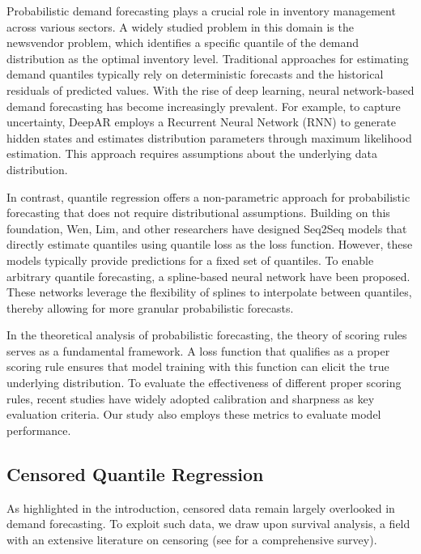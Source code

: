 \documentclass[sigconf]{acmart}
\begin{document}
Probabilistic demand forecasting plays a crucial role in inventory management across various sectors. A widely studied problem in this domain is the newsvendor problem, which identifies a specific quantile of the demand distribution as the optimal inventory level\citep{ban2019big,beutel2012safety}. Traditional approaches for estimating demand quantiles typically rely on deterministic forecasts and the historical residuals of predicted values\citep{levi2015data}. With the rise of deep learning, neural network-based demand forecasting has become increasingly prevalent. For example, to capture uncertainty, DeepAR employs a Recurrent Neural Network (RNN) to generate hidden states and estimates distribution parameters through maximum likelihood estimation\citep{salinas2020deepar}. This  approach requires assumptions about the underlying data distribution.

In contrast, quantile regression offers a non-parametric approach for probabilistic forecasting that does not require distributional assumptions\citep{koenker1978regression}. Building on this foundation, Wen, Lim, and other researchers\citep{wen2017multi,lim2021temporal} have designed Seq2Seq models that directly estimate quantiles using quantile loss as the loss function. However, these models typically provide predictions for a fixed set of quantiles. To enable arbitrary quantile forecasting, a spline-based neural network have been proposed\citep{gasthaus2019probabilistic,park2022learning,taieb2022learning,brando2022deep}. These networks leverage the flexibility of splines to interpolate between quantiles, thereby allowing for more granular probabilistic forecasts.

In the theoretical analysis of probabilistic forecasting, the theory of scoring rules serves as a fundamental framework. A loss function that qualifies as a proper scoring rule ensures that model training with this function can elicit the true underlying distribution\citep{gneiting2007strictly}. To evaluate the effectiveness of different proper scoring rules, recent studies have widely adopted calibration and sharpness as key evaluation criteria\citep{chung2021beyond,taieb2022learning,feldman2021improving}. Our study also employs these metrics to evaluate model performance.


\subsection{Censored Quantile Regression}
As highlighted in the introduction, censored data remain largely overlooked in demand forecasting. To exploit such data, we draw upon survival analysis, a field with an extensive literature on censoring (see \citep{wang2019machine,peng2021quantile} for a comprehensive survey). 
\end{document}

